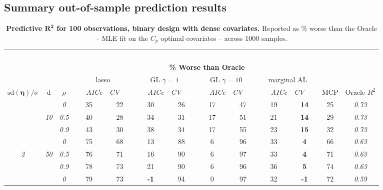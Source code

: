 
\subsection{Summary out-of-sample prediction results}


\begin{table}
\vspace{-.2cm}
\footnotesize
\caption{ 
	{\bf  Predictive $\boldsymbol{R^2}$ for 100 observations, 
	binary design with dense covariates.}
  Reported as  \% worse than the Oracle 
  -- MLE fit on the $C_p$ optimal covariates -- 
  across 1000 samples.}
\begin{center}
\begin{tabular}{ccc|cc|cc|cc|cc|c|c}
\hline &&&\multicolumn{9}{|c|}{~}\\[-1ex]
\multicolumn{3}{c}{~}&\multicolumn{9}{|c|}{\bf \% Worse than Oracle } &   \\[1ex]
& &
& \multicolumn{2}{c}{lasso} 
& \multicolumn{2}{c}{GL $\gamma=1$} 
& \multicolumn{2}{c}{GL $\gamma=10$} 
& \multicolumn{2}{c}{marginal AL} 
& \multicolumn{1}{c|}{~} & \\[-0.5ex]
$\mathrm{sd}(\boldsymbol{\eta})/\sigma$ & {\sf d} & $\rho$ 
& ~~~\scriptsize\it AICc & \multicolumn{1}{c}{\scriptsize\it CV~~~}
& ~~~\scriptsize\it AICc & \multicolumn{1}{c}{\scriptsize\it CV~~~}
& ~~~\scriptsize\it AICc & \multicolumn{1}{c}{\scriptsize\it CV~~~}
& ~~~\scriptsize\it AICc & \multicolumn{1}{c}{\scriptsize\it CV~~~} 
& \multicolumn{1}{c|}{ MCP} & Oracle $R^2$ \\[.5ex]
\hline\rule{0pt}{3ex}
& & \it  0  & 35 & 22 & 30 & 26 & 17 & 47 & 19 & {\bf 14} & 25 & \it  0.73 \\
 & \it  10  & \it  0.5  & 40 & 28 & 34 & 31 & 17 & 51 & 21 & {\bf 14} & 29 & \it  0.73 \\
& & \it  0.9  & 43 & 30 & 38 & 34 & 17 & 55 & 23 & {\bf 15} & 32 & \it  0.73 \\[1ex]
\cline{2-3}\rule{0pt}{3ex}
& & \it  0  & 75 & 68 & 13 & 88 & 6 & 96 & 33 & {\bf 4} & 66 & \it  0.63 \\
\it  2  & \it  50  & \it  0.5  & 76 & 71 & 16 & 90 & 6 & 97 & 33 & {\bf 4} & 71 & \it  0.63 \\
& & \it  0.9  & 78 & 73 & 21 & 90 & 6 & 96 & 36 & {\bf 5} & 74 & \it  0.63 \\[1ex]
\cline{2-3}\rule{0pt}{3ex}
& & \it  0  & 79 & 73 & {\bf -1} & 94 & 0 & 97 & 32 & {\bf -1} & 72 & \it  0.59 \\

\end{tabular}
\end{center}
\end{table}
